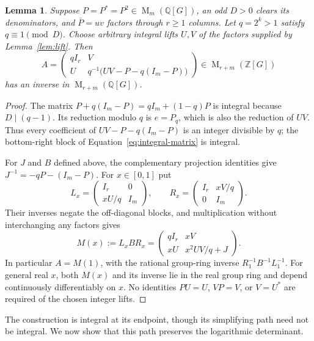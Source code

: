 \documentclass[11pt]{article}
\newtheorem{lemma}[theorem]{Lemma}
\theoremstyle{remark}
\numberwithin{equation}{section}
\newcommand{\Z}{\mathbb Z}
\newcommand{\Q}{\mathbb Q}
\newcommand{\Mat}{\operatorname{M}}
\begin{document}
\begin{lemma}\label{lem:integral}
Suppose $P=P^*=P^2\in\Mat_m(\Q[G])$, an odd $D>0$ clears its
denominators, and $\bar P=uv$ factors through $r\ge1$ columns.
Let $q=2^k>1$ satisfy $q\equiv1\pmod D$. Choose arbitrary
integral lifts $U,V$ of the factors supplied by Lemma~\ref{lem:lift}.
Then
\begin{equation}\label{eq:integral-matrix}
 A=\begin{pmatrix}
 qI_r&V\\
 U&q^{-1}\bigl(UV-P-q(I_m-P)\bigr)
 \end{pmatrix}
 \in\Mat_{r+m}(\Z[G])
\end{equation}
has an inverse in $\Mat_{r+m}(\Q[G])$.
\end{lemma}

\begin{proof}
The matrix $P+q(I_m-P)=qI_m+(1-q)P$ is integral because
$D\mid(q-1)$. Its reduction modulo $q$ is $e=P_q$, which is
also the reduction of $UV$. Thus every coefficient of
$UV-P-q(I_m-P)$ is an integer divisible by $q$; the bottom-right
block of Equation~\eqref{eq:integral-matrix} is integral.

For $J$ and $B$ defined above, the complementary projection identities give
$J^{-1}=-qP-(I_m-P)$. For $x\in[0,1]$ put
\[
 L_x=\begin{pmatrix}I_r&0\\xU/q&I_m\end{pmatrix},\qquad
 R_x=\begin{pmatrix}I_r&xV/q\\0&I_m\end{pmatrix}.
\]
Their inverses negate the off-diagonal blocks, and multiplication
without interchanging any factors gives
\begin{equation}\label{eq:path}
 M(x):=L_xBR_x=
 \begin{pmatrix}qI_r&xV\\xU&x^2UV/q+J\end{pmatrix}.
\end{equation}
In particular $A=M(1)$, with the rational group-ring inverse
$R_1^{-1}B^{-1}L_1^{-1}$. For general real $x$, both $M(x)$ and
its inverse lie in the real group ring and depend continuously
differentiably on $x$. No identities $PU=U$, $VP=V$, or
$V=U^*$ are required of the chosen integer lifts.
\end{proof}

The construction is integral at its endpoint, though its simplifying
path need not be integral. We
now show that this path preserves the logarithmic determinant.
\end{document}
